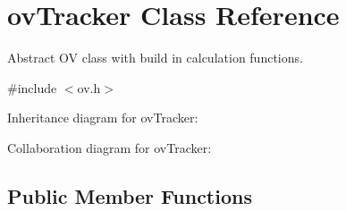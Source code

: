 \hypertarget{classovTracker}{}\section{ov\+Tracker Class Reference}
\label{classovTracker}


Abstract OV class with build in calculation functions.  




{\ttfamily \#include $<$ov.\+h$>$}



Inheritance diagram for ov\+Tracker\+:


Collaboration diagram for ov\+Tracker\+:
\subsection*{Public Member Functions}
